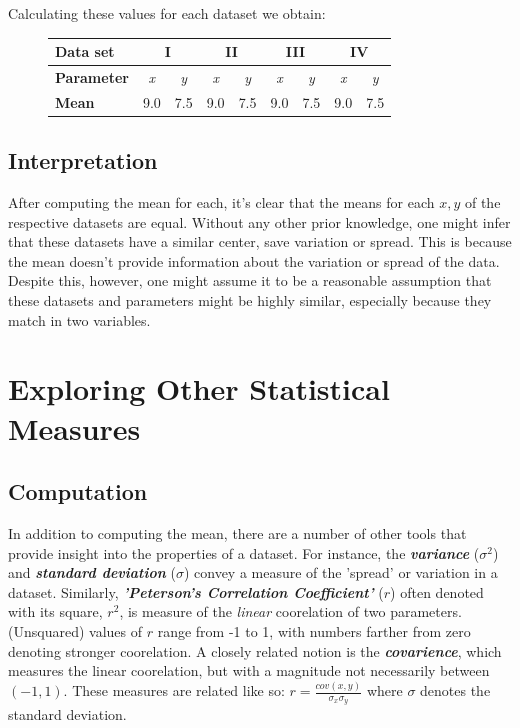 \documentclass[11pt,a4paper]{article}
\begin{document}
Calculating these values for each dataset we obtain:

\begin{figure}[ht]
\centering
\begin{tabular}{|l|cc|cc|cc|cc|}
\hline
\textbf{Data set}         & \multicolumn{2}{c|}{\textbf{I}}              & \multicolumn{2}{c|}{\textbf{II}}             & \multicolumn{2}{c|}{\textbf{III}}            & \multicolumn{2}{c|}{\textbf{IV}}             \\ \hline
\textbf{Parameter} & \multicolumn{1}{c|}{\textit{x}} & \textit{y} & \multicolumn{1}{c|}{\textit{x}} & \textit{y} & \multicolumn{1}{c|}{\textit{x}} & \textit{y} & \multicolumn{1}{c|}{\textit{x}} & \textit{y} \\ \hline
\textbf{Mean}     & \multicolumn{1}{c|}{9.0}        & 7.5        & \multicolumn{1}{c|}{9.0}        & 7.5        & \multicolumn{1}{c|}{9.0}        & 7.5        & \multicolumn{1}{c|}{9.0}        & 7.5        \\ \hline
\end{tabular}
\end{figure}

\subsection{Interpretation}

After computing the mean for each, it's clear that the means for each $x, y$ of the respective datasets are equal. Without any other prior knowledge, one might infer that these datasets have a similar center, save variation or spread. This is because the mean doesn't provide information about the variation or spread of the data. Despite this, however, one might assume it to be a reasonable assumption that these datasets and parameters might be highly similar, especially because they match in two variables.

\section{Exploring Other Statistical Measures}
\subsection{Computation}

In addition to computing the mean, there are a number of other tools that provide insight into the properties of a dataset. For instance, the \textbf{\textit{variance}} ($\sigma^2$) and \textbf{\textit{standard deviation}} ($\sigma$) convey a measure of the 'spread' or variation in a dataset. Similarly, \textbf{\textit{'Peterson's Correlation Coefficient'}} ($r$) often denoted with its square, $r^2$, is measure of the \textit{linear} coorelation of two parameters. (Unsquared) values of $r$ range from -1 to 1, with numbers farther from zero denoting stronger coorelation. A closely related notion is the \textbf{\textit{covarience}}, which measures the linear coorelation, but with a magnitude not necessarily between $(-1, 1)$. These measures are related like so: $r = \frac{cov(x, y)}{\sigma_x \sigma_y}$ where $\sigma$ denotes the standard deviation.
\end{document}
